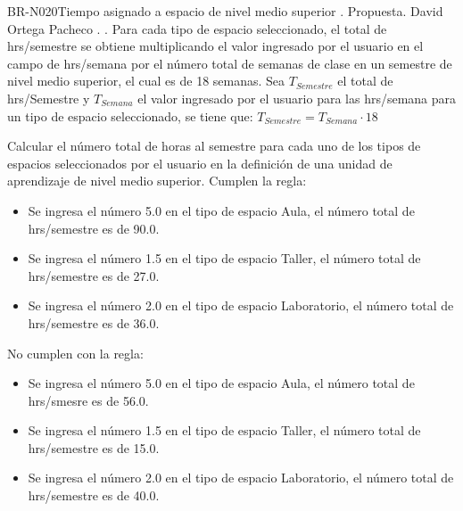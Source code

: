 \begin{BusinessRule}{BR-N020}{Tiempo asignado a espacio de nivel medio superior}
	{\bcIntegridad}    %
	{\btTimer}     %
	{\blControlling}    %
	.
	\BRItem[Estado] Propuesta.
	 David Ortega Pacheco
	 .
	 .
	\BRItem[Descripción] Para cada tipo de espacio seleccionado, el total de hrs/semestre se obtiene multiplicando el valor ingresado por el usuario en el campo de hrs/semana por el número total de semanas de clase en un semestre de nivel medio superior, el cual es de 18 semanas.
	\BRItem[Sentencia] \cdtEmpty Sea $T_{Semestre}$ el total de hrs/Semestre y $T_{Semana}$ el valor ingresado por el usuario para las hrs/semana para un tipo de espacio seleccionado, se tiene que: $ T_{Semestre} = T_{Semana} \cdot 18$

	\BRItem[Motivación] Calcular el número total de horas al semestre para cada uno de los tipos de espacios seleccionados por el usuario en la definición de una unidad de aprendizaje de nivel medio superior.
	 Cumplen la regla:
		\begin{itemize}
			\item Se ingresa el número 5.0 en el tipo de espacio Aula, el número total de hrs/semestre es de 90.0.
			\item Se ingresa el número 1.5 en el tipo de espacio Taller, el número total de hrs/semestre es de 27.0.
			\item Se ingresa el número 2.0 en el tipo de espacio Laboratorio, el número total de hrs/semestre es de 36.0.
		\end{itemize}
	 No cumplen con la regla:
		\begin{itemize}
			\item Se ingresa el número 5.0 en el tipo de espacio Aula, el número total de hrs/smesre es de 56.0.
			\item Se ingresa el número 1.5 en el tipo de espacio Taller, el número total de hrs/semestre es de 15.0.
			\item Se ingresa el número 2.0 en el tipo de espacio Laboratorio, el número total de hrs/semestre es de 40.0.
		\end{itemize}
\end{BusinessRule}

